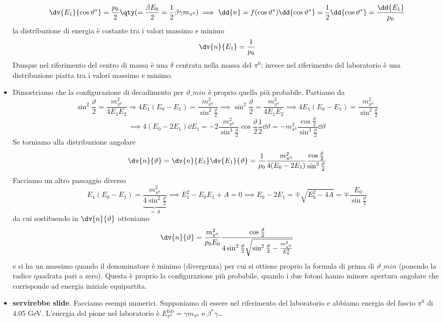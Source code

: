 \begin{itemize}
\begin{equation*}
        \dv{E_1}{\cos\vartheta^*}=\frac{p_0}2\qty(=\frac{\beta E_0}2=\frac12\beta\gamma m_{\pi^0})\implies \dd{n}=f(\cos\vartheta^*)\dd{\cos\vartheta^*}=\frac12\dd{\cos\vartheta^*}=\frac{\dd{E_1}}{p_0}
    \end{equation*}
    la distribuzione di energia è costante tra i valori massimo e minimo
    \begin{equation*}
        \dv{n}{E_1}=\frac{1}{p_0}
    \end{equation*}
    Dunque nel riferimento del centro di massa è una $\delta$ centrata nella massa del $\pi^0$; invece nel riferimento del laboratorio è una distribuzione piatta tra i valori massimo e minimo.
    \item Dimostriamo che la configurazione di decadimento per $\vartheta\_{min}$ è proprio quella più probabile. Partiamo da 
    \begin{equation*}
        \sin^2\frac{\vartheta}{2}=\frac{m_{\pi^0}^2}{4E_1E_2}\Rightarrow 4E_1(E_0-E_1)=\frac{m_{\pi^0}^2}{\sin^2\frac{\vartheta}{2}}{\implies}{}
        \sin^2\frac{\vartheta}{2}=\frac{m_{\pi^0}^2}{4E_1E_2}\implies 4E_1(E_0-E_1)=\frac{m_{\pi^0}^2}{\sin^2\frac{\vartheta}{2}}
    \end{equation*}
    \begin{equation*}
        \implies 4(E_0-2E_1)\dd{E_1}=-2\frac{m_{\pi^0}^2}{\sin^3\frac{\vartheta}{2}}\cos\frac{\vartheta}{2}\frac12\dd{\vartheta}=-m_{\pi^0}^2\frac{\cos\frac{\vartheta}{2}}{\sin^3\frac{\vartheta}{2}}\dd{\vartheta}
    \end{equation*}
    Se torniamo alla distribuzione angolare
    \begin{equation*}
        \dv{n}{\vartheta}=\dv{n}{E_1}\dv{E_1}{\vartheta}=\frac1{p_0}\frac{m_{\pi^0}^2}{4(E_0-2E_1)}\frac{\cos\frac{\vartheta}{2}}{\sin^3\frac{\vartheta}{2}}
    \end{equation*}
    Facciamo un altro passaggio diverso
    \begin{equation*}
        E_1(E_0-E_1)=\underbrace{\frac{m_{\pi^0}^2}{4\sin^2\frac{\vartheta}{2}}}_{=A}\implies E_1^2-E_0E_1+A=0\implies E_0-2E_1=\mp\sqrt{E_0^2-4A}=\mp\frac{E_0}{\sin\frac\vartheta2}
    \end{equation*}
    da cui sostituendo in $\dv{n}{\vartheta}$ otteniamo
    \begin{equation*}
        \dv{n}{\vartheta}=\frac{m_{\pi^0}^2}{p_0E_0}\frac{\cos\frac{\vartheta}{2}}{4\sin^2\frac{\vartheta}{2}\sqrt{\sin^2\frac{\vartheta}{2}-\frac{m_{\pi^0}^2}{E_0^2}}}
    \end{equation*}
    e si ha un massimo quando il denominatore è minimo (divergenza) per cui si ottiene proprio la formula di prima di $\vartheta\_{min}$ (ponendo la radice quadrata pari a zero). Questa è proprio la configurazione più probabile, quando i due fotoni hanno minore apertura angolare che corrisponde ad energia iniziale equipartita.
    \item \textbf{servirebbe slide}. Facciamo esempi numerici. Supponiamo di essere nel riferimento del laboratorio e abbiamo energia del fascio $\pi^0$ di 4.05 GeV. L'energia del pione nel laboratorio è $E_{\pi^0}^{\text{lab}}=\gamma m_{\pi^0}$ e $\beta^*\gamma$\dots
\end{itemize}